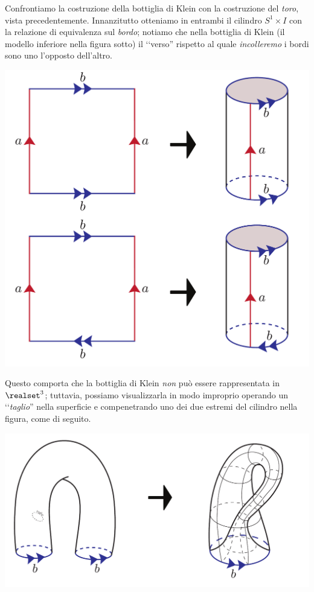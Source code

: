 \begin{examples}
\begin{itemize}
\begin{center}
		\end{center}
		Confrontiamo la costruzione della bottiglia di Klein con la costruzione del \textit{toro}, vista precedentemente. Innanzitutto otteniamo in entrambi il cilindro $S^1\times I$ con la relazione di equivalenza sul \textit{bordo}; notiamo che nella bottiglia di Klein (il modello inferiore nella figura sotto) il ‘‘verso'' rispetto al quale \textit{incolleremo} i bordi sono uno l'opposto dell'altro.
		\begin{center}
			\includegraphics[trim=0cm 0cm 0cm 0cm, clip, scale=0.4]{images/kleintorus.pdf}
		\end{center}
	Questo comporta che la bottiglia di Klein \textit{non} può essere rappresentata in $\realset^3$; tuttavia, possiamo visualizzarla in modo improprio operando un ‘‘\textit{taglio}'' nella superficie e compenetrando uno dei due estremi del cilindro nella figura, come di seguito.
	 \begin{center}
	 	\includegraphics[trim=0cm 0cm 0cm 0cm, clip, scale=0.4]{images/kleinconstruction.pdf}
	 \end{center}
	\end{itemize}
\end{examples}

